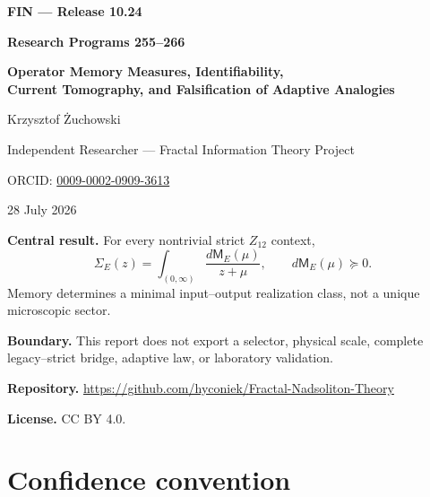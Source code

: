 \documentclass[11pt,a4paper,openany]{report}
\begin{document}
\hypersetup{pageanchor=false}
\begin{titlepage}
\centering
\vspace*{11mm}
{\Large\bfseries FIN --- Release 10.24\par}
\vspace{10mm}
{\Huge\bfseries Research Programs 255--266\par}
\vspace{5mm}
{\LARGE\bfseries Operator Memory Measures, Identifiability,\\
Current Tomography, and Falsification of Adaptive Analogies\par}
\vspace{16mm}
{\Large Krzysztof \.Zuchowski\par}
\vspace{2mm}
{\normalsize Independent Researcher --- Fractal Information Theory Project\par}
\vspace{2mm}
{\normalsize ORCID: \href{https://orcid.org/0009-0002-0909-3613}{0009-0002-0909-3613}\par}
\vspace{9mm}
{\large 28 July 2026\par}
\vfill
\begin{minipage}{0.9\textwidth}
\small
\textbf{Central result.}
For every nontrivial strict \(Z_{12}\) context,
\[
\Sigma_E(z)=\int_{(0,\infty)}\frac{d\mathsf M_E(\mu)}{z+\mu},
\qquad d\mathsf M_E(\mu)\succeq0.
\]
Memory determines a minimal input--output realization class, not a unique
microscopic sector.

\medskip
\textbf{Boundary.}
This report does not export a selector, physical scale, complete
legacy--strict bridge, adaptive law, or laboratory validation.

\medskip
\textbf{Repository.}
\url{https://github.com/hyconiek/Fractal-Nadsoliton-Theory}

\textbf{License.} CC BY 4.0.
\end{minipage}
\vfill
\end{titlepage}
\hypersetup{pageanchor=true}
\tableofcontents
\clearpage
{}

\chapter*{Confidence convention}
\end{document}
